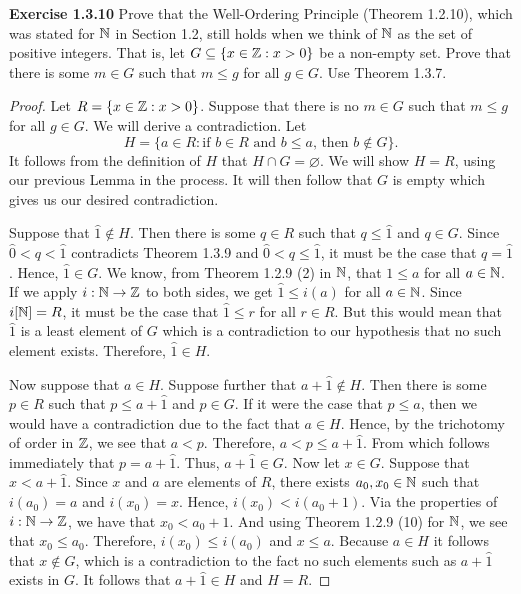\noindent \textbf{Exercise 1.3.10} Prove that the Well-Ordering Principle (Theorem 1.2.10), which was stated for \(\mathbb{N}\) in Section 1.2, still holds when
we think of \(\mathbb{N}\) as the set of positive integers. That is, let \(G \subseteq \{x \in \mathbb{Z} : x > 0\}\) be a non-empty set. Prove that there is some \(m \in G\) such that \(m \leq g\) for all \(g \in G\). Use Theorem 1.3.7.
\begin{proof}
    Let \(R = \{x \in \mathbb{Z} : x > 0\}\).
    Suppose that there is no \(m \in G\) such that \(m \leq g\) for all \(g \in G\). We will derive a contradiction.
    Let \[H = \{a \in R :\text{if }b\in R\text{ and }b \leq a\text{, then }b\notin G\}.\]
    It follows from the definition of \(H\) that \(H \cap G = \varnothing\). We will show \(H = R\), using our previous Lemma in the process. It will then follow that \(G\) is empty which gives us our desired contradiction.
    \par Suppose that \(\hat{1} \notin H\). Then there is some \(q \in R\) such that \(q \leq \hat{1}\) and \(q \in G\). Since \(\hat{0} < q < \hat{1}\) contradicts Theorem 1.3.9 and \(\hat{0} < q \leq \hat{1}\), it must be the case that \(q = \hat{1}\).
    Hence, \(\hat{1} \in G\). We know, from Theorem 1.2.9 (2) in \(\mathbb{N}\), that \(1 \leq a\) for all \(a \in \mathbb{N}\). If we apply \(i : \mathbb{N} \to \mathbb{Z}\) to both sides, we get \(\hat{1} \leq i(a)\) for all \(a \in \mathbb{N}\). Since \(i[\mathbb{N}] = R\), it must be the case that \(\hat{1} \leq r\) for all \(r \in R\).
    But this would mean that \(\hat{1}\) is a least element of \(G\) which is a contradiction to our hypothesis that no such element exists. Therefore, \(\hat{1} \in H\).
    \par Now suppose that \(a \in H\). Suppose further that \(a+\hat{1} \notin H\). Then there is some \(p \in R\) such that \(p \leq a+\hat{1}\) and \(p \in G\). If it were the case that \(p \leq a\), then we would have a contradiction
    due to the fact that \(a \in H\). Hence, by the trichotomy of order in \(\mathbb{Z}\), we see that \(a < p\). Therefore, \(a < p \leq a+\hat{1}\). From which follows immediately that \(p = a+\hat{1}\). Thus, \(a+\hat{1} \in G\). Now let \(x \in G\). Suppose that \(x < a+\hat{1}\). Since \(x\) and \(a\) are elements of \(R\), there exists \(a_0, x_0 \in \mathbb{N}\) such that \(i(a_0) = a\) and \(i(x_0) = x\).
    Hence, \(i(x_0) < i(a_0+1)\). Via the properties of \(i :\mathbb{N} \to \mathbb{Z}\), we have that \(x_0 < a_0 + 1\). And using Theorem 1.2.9 (10) for \(\mathbb{N}\), we see that \(x_0 \leq a_0\). Therefore, \(i(x_0) \leq i(a_0)\) and \(x \leq a\). Because \(a \in H\) it follows that \(x \notin G\), which is a contradiction to the fact no such elements such as \(a+\hat{1}\) exists in \(G\). It follows that \(a+\hat{1} \in H\) and \(H = R\).
\end{proof}

